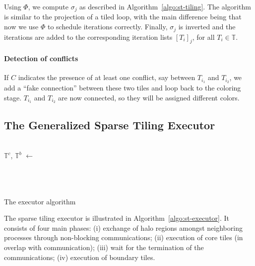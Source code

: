 Using $\Phi$, we compute $\sigma_j$ as described in Algorithm~\ref{algo:st-tiling}. The algorithm is similar to the projection of a tiled loop, with the main difference being that now we use $\Phi$ to schedule iterations correctly. Finally, $\sigma_j$ is inverted and the iterations are added to the corresponding iteration lists $[T_i]_j$, for all $T_i \in \mathbb{T}$. 


\paragraph{Detection of conflicts}
If $C$ indicates the presence of at least one conflict, say between $T_{i_1}$ and $T_{i_2}$, we add a ``fake connection'' between these two tiles and loop back to the coloring stage. $T_{i_1}$ and $T_{i_2}$ are now connected, so they will be assigned different colors. 



\subsection{The Generalized Sparse Tiling Executor}

\begin{algorithm}[htpb]

\nonl ~\\
$\mathbb{T}^{c}$, $\mathbb{T}^{b}$ $\gets$ \;
\nonl ~\\
\SMC{}\;
\nonl ~\\
\nonl ~\\
\EMC{}\;
\nonl ~\\
\caption{The executor algorithm}
\label{algo:st-executor}
\end{algorithm}


The sparse tiling executor is illustrated in Algorithm~\ref{algo:st-executor}. It consists of four main phases: (i) exchange of halo regions amongst neighboring processes through non-blocking communications; (ii) execution of core tiles (in overlap with communication); (iii) wait for the termination of the communications; (iv) execution of boundary tiles. 

